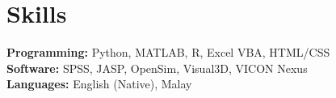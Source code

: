 \documentclass[../main.tex]{subfiles}
\begin{document}
\section{Skills}
  \vspace{2pt}
  \resumeSubHeadingListStart
    {\item{
        \textbf{Programming: }{Python, MATLAB, R, Excel VBA, HTML/CSS} \\ \vspace{2pt}
        \textbf{Software: }{SPSS, JASP, OpenSim, Visual3D, VICON Nexus} \\ \vspace{2pt}
        \textbf{Languages: }{English (Native), Malay} \\ \vspace{2pt}
        
    }}
  \resumeSubHeadingListEnd
\end{document}
